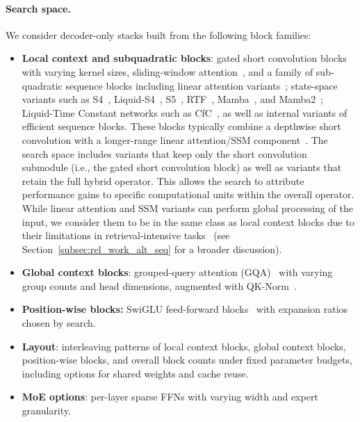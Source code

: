 \documentclass{article}
\begin{document}
\paragraph{Search space.} We consider decoder-only stacks built from the following block families:
\begin{itemize}
  \item \textbf{Local context and subquadratic blocks}: gated short convolution blocks with varying kernel sizes, sliding-window attention~\citep{child2019generating}, and a family of sub-quadratic sequence blocks including linear attention variants~\citep{katharopoulos2020transformers,yang2024gated,yang2025gated}; 
  state-space variants such as S4~\citep{gu2022efficiently}, Liquid-S4~\citep{hasani2023liquid}, S5~\citep{smith2023simplified}, RTF~\citep{parnichkun2024state}, Mamba~\citep{gu2022efficiently}, and Mamba2~\citep{dao2024transformers}; Liquid-Time Constant networks such as CfC~\citep{hasani2022closed}, as well as internal variants of efficient sequence blocks. These blocks typically combine a depthwise short convolution with a longer-range linear attention/SSM component~\citep{fu2023hungry,poli2023hyena,gu2024mamba}. The search space includes variants that keep only the short convolution submodule (i.e., the gated short convolution block) as well as variants that retain the full hybrid operator. This allows the search to attribute performance gains to specific computational units within the overall operator. While linear attention and SSM variants can perform global processing of the input, we consider them to be in the same class as local context blocks due to their limitations in retrieval-intensive tasks~\citep{wen2025rnns, arora2024simple, blouir2024birdie, parnichkun2025quantifying} (see Section~\ref{subsec:rel_work_alt_seq} for a broader discussion).
  \item \textbf{Global context blocks}: grouped-query attention (GQA)~\citep{ainslie2023gqa} with varying group counts and head dimensions, augmented with QK-Norm~\citep{dehghani2023scaling}.
  \item \textbf{Position-wise blocks:} SwiGLU feed-forward blocks~\citep{shazeer2020glu} with expansion ratios chosen by search.
  \item \textbf{Layout}: interleaving patterns of local context blocks, global context blocks, position-wise blocks, and overall block counts under fixed parameter budgets, including options for shared weights and cache reuse.
  \item \textbf{MoE options}: per-layer sparse FFNs with varying width and expert granularity.
\end{itemize}
\end{document}
